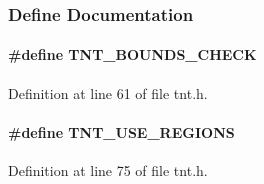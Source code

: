 \subsubsection{Define Documentation}
\paragraph[{TNT\_\-BOUNDS\_\-CHECK}]{\setlength{\rightskip}{0pt plus 5cm}\#define TNT\_\-BOUNDS\_\-CHECK}\hfill\label{tnt_8h_ac2c4dfa6823437464bb5b871c31dbd0b}


Definition at line 61 of file tnt.h.

\paragraph[{TNT\_\-USE\_\-REGIONS}]{\setlength{\rightskip}{0pt plus 5cm}\#define TNT\_\-USE\_\-REGIONS}\hfill\label{tnt_8h_a37800f21c47f9b2d80bcd2ca10fde8b0}


Definition at line 75 of file tnt.h.

